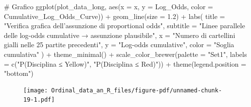 \documentclass[
  letterpaper,
  DIV=11,
  numbers=noendperiod]{scrartcl}
\newenvironment{Shaded}{\begin{snugshade}}{\end{snugshade}}
\newcommand{\AttributeTok}[1]{\textcolor[rgb]{0.40,0.45,0.13}{#1}}
\newcommand{\CommentTok}[1]{\textcolor[rgb]{0.37,0.37,0.37}{#1}}
\newcommand{\FloatTok}[1]{\textcolor[rgb]{0.68,0.00,0.00}{#1}}
\newcommand{\FunctionTok}[1]{\textcolor[rgb]{0.28,0.35,0.67}{#1}}
\newcommand{\NormalTok}[1]{\textcolor[rgb]{0.00,0.23,0.31}{#1}}
\newcommand{\SpecialCharTok}[1]{\textcolor[rgb]{0.37,0.37,0.37}{#1}}
\newcommand{\StringTok}[1]{\textcolor[rgb]{0.13,0.47,0.30}{#1}}
\begin{document}
\begin{Shaded}
\begin{Highlighting}[]
\CommentTok{\# Grafico}
\FunctionTok{ggplot}\NormalTok{(plot\_data\_long, }\FunctionTok{aes}\NormalTok{(}\AttributeTok{x =}\NormalTok{ x, }\AttributeTok{y =}\NormalTok{ Log\_Odds, }\AttributeTok{color =}\NormalTok{ Cumulative\_Log\_Odds\_Curve)) }\SpecialCharTok{+}
  \FunctionTok{geom\_line}\NormalTok{(}\AttributeTok{size =} \FloatTok{1.2}\NormalTok{) }\SpecialCharTok{+}
  \FunctionTok{labs}\NormalTok{(}
    \AttributeTok{title =} \StringTok{"Verifica grafica dell’assunzione di proportional odds"}\NormalTok{,}
    \AttributeTok{subtitle =} \StringTok{"Linee parallele delle log{-}odds cumulative → assunzione plausibile"}\NormalTok{,}
    \AttributeTok{x =} \StringTok{"Numero di cartellini gialli nelle 25 partite precedenti"}\NormalTok{,}
    \AttributeTok{y =} \StringTok{"Log{-}odds cumulative"}\NormalTok{,}
    \AttributeTok{color =} \StringTok{"Soglia cumulativa"}
\NormalTok{  ) }\SpecialCharTok{+}
  \FunctionTok{theme\_minimal}\NormalTok{() }\SpecialCharTok{+}
  \FunctionTok{scale\_color\_brewer}\NormalTok{(}\AttributeTok{palette =} \StringTok{"Set1"}\NormalTok{, }\AttributeTok{labels =} \FunctionTok{c}\NormalTok{(}\StringTok{"P(Disciplina ≤ Yellow)"}\NormalTok{, }\StringTok{"P(Disciplina ≤ Red)"}\NormalTok{)) }\SpecialCharTok{+}
  \FunctionTok{theme}\NormalTok{(}\AttributeTok{legend.position =} \StringTok{"bottom"}\NormalTok{)}
\end{Highlighting}
\end{Shaded}

\begin{figure}[H]

{\centering \texttt{[image: Ordinal\_data\_an\_R\_files/figure-pdf/unnamed-chunk-19-1.pdf]}

}

\end{figure}
\end{document}
